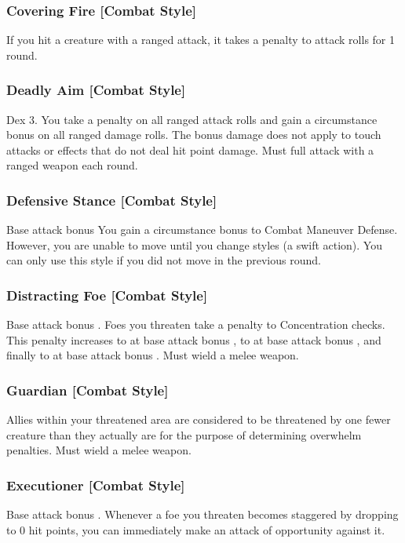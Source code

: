 \subsubsection{Covering Fire [Combat Style]}
 If you hit a creature with a ranged attack, it takes a  penalty to attack rolls for 1 round.

\subsubsection{Deadly Aim [Combat Style]}
 Dex 3.
 You take a  penalty on all ranged attack rolls and gain a  circumstance bonus on all ranged damage rolls. \babscalingdescription The bonus damage does not apply to touch attacks or effects that do not deal hit point damage.
 Must full attack with a ranged weapon each round.

\subsubsection{Defensive Stance [Combat Style]}
 Base attack bonus 
 You gain a  circumstance bonus to Combat Maneuver Defense. \babscalingdescription However, you are unable to move until you change styles (a swift action). You can only use this style if you did not move in the previous round.

\subsubsection{Distracting Foe [Combat Style]}
 Base attack bonus .
 Foes you threaten take a  penalty to Concentration checks. This penalty increases to  at base attack bonus , to  at base attack bonus , and finally to  at base attack bonus .
 Must wield a melee weapon.

\subsubsection{Guardian [Combat Style]}
 Allies within your threatened area are considered to be threatened by one fewer creature than they actually are for the purpose of determining overwhelm penalties.
 Must wield a melee weapon.

\subsubsection{Executioner [Combat Style]}
 Base attack bonus .
 Whenever a foe you threaten becomes staggered by dropping to 0 hit points, you can immediately make an attack of opportunity against it.

